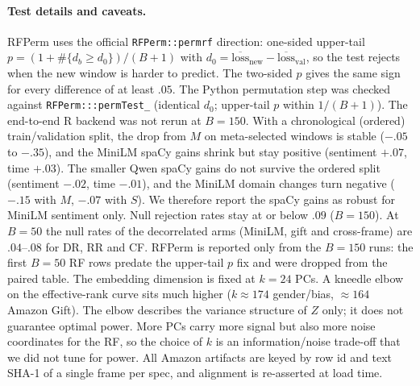 \documentclass[11pt]{article}
\begin{document}
\paragraph{Test details and caveats.}
RFPerm uses the official \texttt{RFPerm::permrf} direction: one-sided upper-tail
$p=(1+\#\{d_b\ge d_0\})/(B+1)$ with $d_0=\overline{\mathrm{loss}}_{\mathrm{new}}-\overline{\mathrm{loss}}_{\mathrm{val}}$,
so the test rejects when the new window is harder to predict.
The two-sided $p$ gives the same sign for every difference of at least $.05$.
The Python permutation step was checked against \texttt{RFPerm:::permTest\_} (identical $d_0$; upper-tail
$p$ within $1/(B+1)$). The end-to-end R backend was not rerun at $B{=}150$.
With a chronological (ordered) train/validation split, the drop from $M$ on meta-selected windows is
stable ($-.05$ to $-.35$), and the MiniLM spaCy gains shrink but stay positive
(sentiment $+.07$, time $+.03$).
The smaller Qwen spaCy gains do not survive the ordered split (sentiment $-.02$, time $-.01$), and the
MiniLM domain changes turn negative ($-.15$ with $M$, $-.07$ with $S$).
We therefore report the spaCy gains as robust for MiniLM sentiment only.
Null rejection rates stay at or below $.09$ ($B{=}150$).
At $B{=}50$ the null rates of the decorrelated arms (MiniLM, gift and cross-frame) are $.04$--$.08$ for
DR, RR and CF.
RFPerm is reported only from the $B{=}150$ runs: the first $B{=}50$ RF rows predate the upper-tail $p$ fix
and were dropped from the paired table.
The embedding dimension is fixed at $k{=}24$ PCs. A kneedle elbow on the effective-rank curve sits much
higher ($k\approx174$ gender/bias, $\approx164$ Amazon Gift).
The elbow describes the variance structure of $Z$ only; it does not guarantee optimal power.
More PCs carry more signal but also more noise coordinates for the RF, so the choice of $k$ is an
information/noise trade-off that we did not tune for power.
All Amazon artifacts are keyed by row id and text SHA-1 of a single frame per spec, and alignment
is re-asserted at load time.
\end{document}
